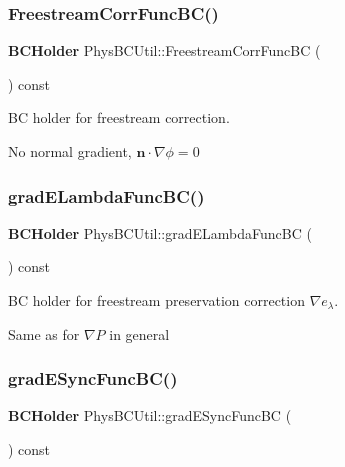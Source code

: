 \subsubsection{\texorpdfstring{Freestream\+Corr\+Func\+B\+C()}{FreestreamCorrFuncBC()}}
{\footnotesize\ttfamily \textbf{ B\+C\+Holder} Phys\+B\+C\+Util\+::\+Freestream\+Corr\+Func\+BC (\begin{DoxyParamCaption}{ }\end{DoxyParamCaption}) const\hspace{0.3cm}{\ttfamily [virtual]}}



BC holder for freestream correction. 

No normal gradient, $ \mathbf{n} \cdot \nabla \phi = 0 $ \mbox{\label{class_phys_b_c_util_ac70d7c8b4b144cccbe0fe9d6715c5b86}} 
\subsubsection{\texorpdfstring{grad\+E\+Lambda\+Func\+B\+C()}{gradELambdaFuncBC()}}
{\footnotesize\ttfamily \textbf{ B\+C\+Holder} Phys\+B\+C\+Util\+::grad\+E\+Lambda\+Func\+BC (\begin{DoxyParamCaption}{ }\end{DoxyParamCaption}) const\hspace{0.3cm}{\ttfamily [virtual]}}



BC holder for freestream preservation correction $ \nabla e_\lambda $. 

Same as for $ \nabla P $ in general \mbox{\label{class_phys_b_c_util_a111040058c4df423daa036b8555e2bf1}} 
\subsubsection{\texorpdfstring{grad\+E\+Sync\+Func\+B\+C()}{gradESyncFuncBC()}}
{\footnotesize\ttfamily \textbf{ B\+C\+Holder} Phys\+B\+C\+Util\+::grad\+E\+Sync\+Func\+BC (\begin{DoxyParamCaption}{ }\end{DoxyParamCaption}) const\hspace{0.3cm}{\ttfamily [virtual]}}



